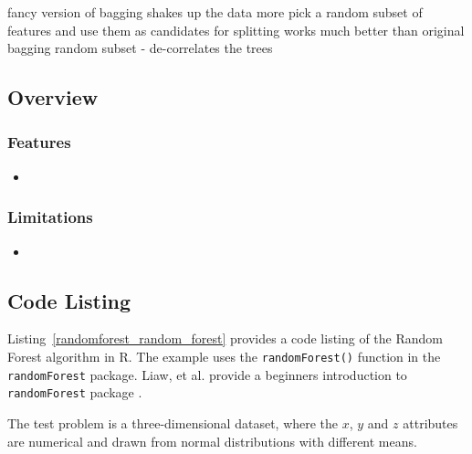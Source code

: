 fancy version of bagging
shakes up the data more
pick a random subset of features and use them as candidates for splitting
works much better than original bagging
random subset - de-correlates the trees



\subsection{Overview}

\subsubsection{Features}

\begin{itemize}
	\item 
\end{itemize}

\subsubsection{Limitations}

\begin{itemize}
	\item 
\end{itemize}


\subsection{Code Listing}
Listing~\ref{randomforest_random_forest} provides a code listing of the Random Forest algorithm in R.
The example uses the \texttt{randomForest()} function in the \texttt{randomForest} package.
Liaw, et al. provide a beginners introduction to \texttt{randomForest} package \cite{Liaw2002}.

The test problem is a three-dimensional dataset, where the $x$, $y$ and $z$ attributes are numerical and drawn from normal distributions with different means. 



